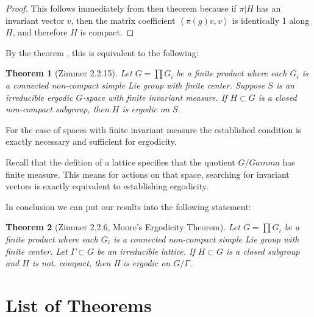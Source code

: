 \documentclass[
  12pt
]{article}
\newtheorem{thm}{Theorem}[section]
\theoremstyle{plain}
\newtheorem*{proof}{Proof}
\newcommand{\G}{\ensuremath{G}\xspace}
\newcommand{\inn}[1]{\left\langle #1 \right\rangle}
\begin{document}
  \begin{proof}
    This follows immediately from then theorem because if $\pi|H$ has an invariant vector $v$, then the matrix coefficient $\inn{\pi(g)v,v}$ is identically 1 along $H$, and therefore $H$ is compact.
  \end{proof}


  By the theorem , this is equivalent to the following:


  \begin{thm}[Zimmer 2.2.15]
    \label{thm:2.2.15}
    Let $G = \prod G_i$ be a finite product where each $G_i$ is a connected
    non-compact simple Lie group with finite center. Suppose $S$ is an
    irreducible ergodic \G-space with finite invariant measure. If $H \subset
    G$ is a closed non-compact subgroup, then $H$ is ergodic on $S$.
  \end{thm}

  For the case of spaces with finite invariant measure the established condition is exactly necessary and sufficient for ergodicity.

  Recall that the defition of a lattice specifies that the quotient $G/Gamma$ has finite measure. This means for actions on that space, searching for invariant vectors is exactly equivalent to establishing ergodicity.

  In conclusion we can put our results into the following statement:

  \begin{thm}[Zimmer 2.2.6, Moore's Ergodicity Theorem]
    \label{thm:2.2.6}
    Let $G = \prod G_i$ be a finite product where each $G_i$ is a connected
    non-compact simple Lie group with finite center. Let $\Gamma \subset G$ be
    an irreducible lattice. If $H \subset G$ is a closed subgroup and $H$ is
    not. compact, then H is ergodic on $G/\Gamma$.
  \end{thm}









\cleardoublepage


\section{List of Theorems}

{}
\listoffigures

{}
\printbibliography

\end{document}
